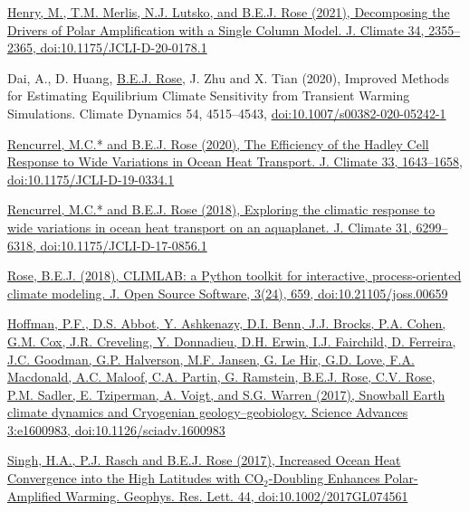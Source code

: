 \documentclass[11pt, letterpaper]{article} %
\newcommand{\years}[1]{\marginnote{\scriptsize #1}} %
\newcommand{\publink}{http://www.atmos.albany.edu/facstaff/brose/resources/Publications/}
\begin{document}
\href{\publink Henry_etal_JClim2021.pdf}{Henry, M., T.M. Merlis, N.J. Lutsko, and \underline{B.E.J. Rose} (2021), Decomposing the Drivers of Polar Amplification with a Single Column Model. J. Climate 34, 2355--2365, doi:10.1175/JCLI-D-20-0178.1}
\vspace{0.2 cm}

\years{2020} 
Dai, A., D. Huang, \underline{B.E.J. Rose}, J. Zhu and X. Tian (2020), Improved Methods for Estimating Equilibrium Climate Sensitivity from Transient Warming Simulations. Climate Dynamics 54, 4515--4543, \href{https://doi.org/10.1007/s00382-020-05242-1}{doi:10.1007/s00382-020-05242-1}
\vspace{0.2 cm}

\href{\publink Rencurrel_Rose_JClim2020.pdf}{Rencurrel, M.C.* and \underline{B.E.J. Rose} (2020), The Efficiency of the Hadley Cell Response to Wide Variations in Ocean Heat Transport. J. Climate 33, 1643--1658, doi:10.1175/JCLI-D-19-0334.1}
\vspace{0.2 cm}

\years{2018} 
\href{\publink Rencurrel_Rose_jcli-d-17-0856.1.pdf}{Rencurrel, M.C.* and \underline{B.E.J. Rose} (2018), Exploring the climatic response to wide variations in ocean heat transport on an aquaplanet. J. Climate 31, 6299--6318, doi:10.1175/JCLI-D-17-0856.1} 
\vspace{0.2 cm}

\href{\publink Rose_JOSS2018.pdf}{\underline{Rose, B.E.J.} (2018), CLIMLAB: a Python toolkit for interactive, process-oriented climate modeling. J. Open Source Software, 3(24), 659, doi:10.21105/joss.00659}
\vspace{0.2 cm}

\years{2017} 
\href{http://advances.sciencemag.org/content/3/11/e1600983}{Hoffman, P.F., D.S. Abbot, Y. Ashkenazy, D.I. Benn, J.J. Brocks, P.A. Cohen, G.M. Cox, J.R. Creveling, Y. Donnadieu, D.H. Erwin, I.J. Fairchild, D. Ferreira, J.C. Goodman, G.P. Halverson, M.F. Jansen, G. Le Hir, G.D. Love, F.A. Macdonald, A.C. Maloof, C.A. Partin, G. Ramstein, \underline{B.E.J. Rose}, C.V. Rose, P.M. Sadler, E. Tziperman, A. Voigt, and S.G. Warren (2017), Snowball Earth climate dynamics and Cryogenian geology--geobiology. Science Advances 3:e1600983, doi:10.1126/sciadv.1600983}
\vspace{0.2 cm}

\href{\publink Singh_et_al-2017-Geophysical_Research_Letters-2.pdf}{Singh, H.A., P.J. Rasch and \underline{B.E.J. Rose} (2017), Increased Ocean Heat Convergence into the High Latitudes with CO$_2$-Doubling Enhances Polar-Amplified Warming. Geophys. Res. Lett. 44, doi:10.1002/2017GL074561}
\vspace{0.2 cm}
\end{document}
